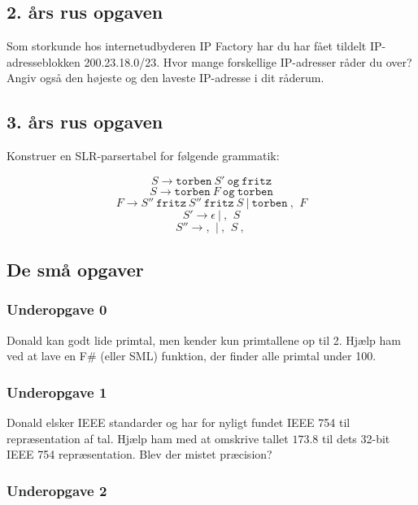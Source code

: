 \subsection{2. års rus opgaven}
Som storkunde hos internetudbyderen IP Factory har du har fået tildelt IP-adresseblokken 200.23.18.0/23.
Hvor mange forskellige IP-adresser råder du over? Angiv også den højeste og den laveste IP-adresse i dit råderum.

\subsection{3. års rus opgaven}
Konstruer en SLR-parsertabel for følgende grammatik:

\[
S \rightarrow \texttt{torben}\ S'\ \texttt{og}\ \texttt{fritz}
\]
\[
S \rightarrow \texttt{torben}\ F\ \texttt{og}\ \texttt{torben}
\]
\[
F \rightarrow S''\ \texttt{fritz}\ S''\ \texttt{fritz}\ S\ |\ \texttt{torben}\ \texttt{, }\ F
\]
\[
S' \rightarrow \epsilon\ |\ \texttt{, }\ S
\]
\[
S'' \rightarrow \texttt{, }\ |\ \texttt{, }\ S\ \texttt{, }
\]

\newpage

\subsection{De små opgaver}
\vspace{-0.1cm}

\subsubsection{Underopgave 0}
\vspace{-0.2cm}

Donald kan godt lide primtal, men kender kun primtallene op til 2. Hjælp ham
ved at lave en F\# (eller SML) funktion, der finder alle primtal under 100.

\subsubsection{Underopgave 1}

Donald elsker IEEE standarder og har for nyligt fundet IEEE 754 til
repræsentation af tal. Hjælp ham med at omskrive tallet $173.8$ til dets
32-bit IEEE 754 repræsentation. Blev der mistet præcision?


\subsubsection{Underopgave 2}
\vspace{-0.2cm}

